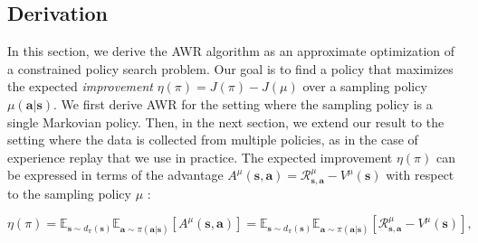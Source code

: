 \begin{algorithm}[t]
            \caption{Advantage-Weighted Regression}
            \begin{algorithmic}[1]



            \ENDFOR

            \end{algorithmic}
            \label{alg:AWR}
\end{algorithm}

\subsection{Derivation}
In this section, we derive the AWR algorithm as an approximate optimization of a constrained policy search problem. Our goal is to find a policy that maximizes the expected \emph{improvement} ${\eta(\pi) = J(\pi) - J(\mu)}$ over a sampling policy $\mu({\mathbf{a}} | {\mathbf{s}})$. We first derive AWR for the setting where the sampling policy is a single Markovian policy. Then, in the next section, we extend our result to the setting where the data is collected from multiple policies, as in the case of experience replay that we use in practice. The expected improvement $\eta(\pi)$ can be expressed in terms of the advantage $A^\mu({\mathbf{s}}, {\mathbf{a}}) = \mathcal{R}_{{\mathbf{s}},{\mathbf{a}}}^\mu - V^\mu({\mathbf{s}})$ with respect to the sampling policy $\mu$ \citep{Kakade2002,TRPOschulman15}:

\begin{equation}
    \eta(\pi) = \mathbb{E}_{{\mathbf{s}} \sim d_\pi({\mathbf{s}})} \mathbb{E}_{{\mathbf{a}} \sim \pi({\mathbf{a}}|{\mathbf{s}})} \left[A^\mu({\mathbf{s}}, {\mathbf{a}}) \right] = \mathbb{E}_{{\mathbf{s}} \sim d_\pi({\mathbf{s}})} \mathbb{E}_{{\mathbf{a}} \sim \pi({\mathbf{a}} | {\mathbf{s}})} \left[\mathcal{R}_{{\mathbf{s}},{\mathbf{a}}}^\mu - V^\mu({\mathbf{s}})\right], \label{eqn:Improvement}
\end{equation}

